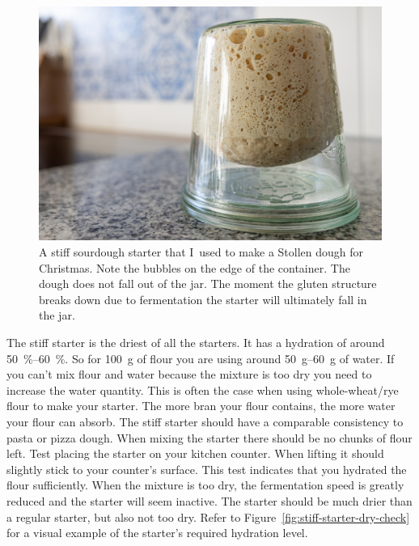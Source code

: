 \begin{figure}[!htb]
  \includegraphics[width=\textwidth]{sourdough-starter-stiff.jpg}
  \caption[Stiff starter upside-down]{A stiff sourdough starter that I~used to
      make a Stollen dough for Christmas. Note the bubbles on the edge of the
      container. The dough does not fall out of the jar. The moment
      the gluten structure breaks down due to fermentation the starter
      will ultimately fall in the jar.}%
  \label{flc:stiff-sourdough-starter}
\end{figure}

The stiff starter is the driest of all the starters. It has a hydration of
around \qtyrange{50}{60}{\percent}. So for \qty{100}{\gram} of flour you are using around
\qtyrange{50}{60}{\gram} of water. If you can't mix flour and water because the
mixture is too dry you need to increase the water quantity. This is often
the case when using whole-wheat/rye flour to make your starter. The
more bran your flour contains, the more water your flour can absorb. The stiff
starter should have a comparable consistency to pasta or pizza dough. When
mixing the starter there should be no chunks of flour left. Test placing
the starter on your kitchen counter. When lifting it should slightly stick
to your counter's surface. This test indicates that you hydrated the flour sufficiently.
When the mixture is too dry, the fermentation speed is greatly reduced and
the starter will seem inactive. The starter should be much drier than a
regular starter, but also not too dry. Refer to
Figure~\ref{fig:stiff-starter-dry-check} for a visual example of the starter's
required hydration level.


